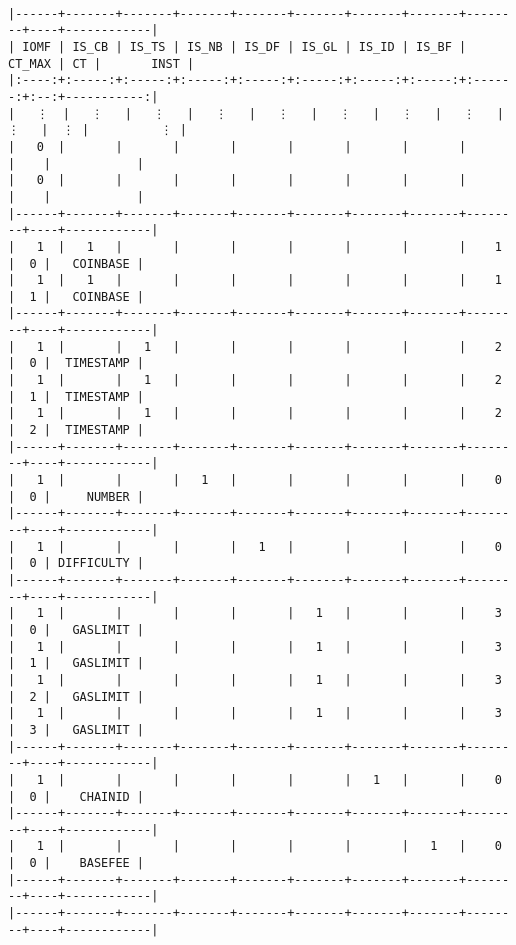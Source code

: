 \documentclass[varwidth=\maxdimen,margin=0.5cm,multi={verbatim}]{standalone}
\begin{document}
\begin{verbatim}

|------+-------+-------+-------+-------+-------+-------+-------+--------+----+------------|
| IOMF | IS_CB | IS_TS | IS_NB | IS_DF | IS_GL | IS_ID | IS_BF | CT_MAX | CT |       INST |
|:----:+:-----:+:-----:+:-----:+:-----:+:-----:+:-----:+:-----:+:------:+:--:+-----------:|
|   ⋮  |   ⋮   |   ⋮   |   ⋮   |   ⋮   |   ⋮   |   ⋮   |   ⋮   |    ⋮   |  ⋮ |          ⋮ |
|   0  |       |       |       |       |       |       |       |        |    |            |
|   0  |       |       |       |       |       |       |       |        |    |            |
|------+-------+-------+-------+-------+-------+-------+-------+--------+----+------------|
|   1  |   1   |       |       |       |       |       |       |    1   |  0 |   COINBASE |
|   1  |   1   |       |       |       |       |       |       |    1   |  1 |   COINBASE |
|------+-------+-------+-------+-------+-------+-------+-------+--------+----+------------|
|   1  |       |   1   |       |       |       |       |       |    2   |  0 |  TIMESTAMP |
|   1  |       |   1   |       |       |       |       |       |    2   |  1 |  TIMESTAMP |
|   1  |       |   1   |       |       |       |       |       |    2   |  2 |  TIMESTAMP |
|------+-------+-------+-------+-------+-------+-------+-------+--------+----+------------|
|   1  |       |       |   1   |       |       |       |       |    0   |  0 |     NUMBER |
|------+-------+-------+-------+-------+-------+-------+-------+--------+----+------------|
|   1  |       |       |       |   1   |       |       |       |    0   |  0 | DIFFICULTY |
|------+-------+-------+-------+-------+-------+-------+-------+--------+----+------------|
|   1  |       |       |       |       |   1   |       |       |    3   |  0 |   GASLIMIT |
|   1  |       |       |       |       |   1   |       |       |    3   |  1 |   GASLIMIT |
|   1  |       |       |       |       |   1   |       |       |    3   |  2 |   GASLIMIT |
|   1  |       |       |       |       |   1   |       |       |    3   |  3 |   GASLIMIT |
|------+-------+-------+-------+-------+-------+-------+-------+--------+----+------------|
|   1  |       |       |       |       |       |   1   |       |    0   |  0 |    CHAINID |
|------+-------+-------+-------+-------+-------+-------+-------+--------+----+------------|
|   1  |       |       |       |       |       |       |   1   |    0   |  0 |    BASEFEE |
|------+-------+-------+-------+-------+-------+-------+-------+--------+----+------------|
|------+-------+-------+-------+-------+-------+-------+-------+--------+----+------------|

\end{verbatim}
\end{document}
